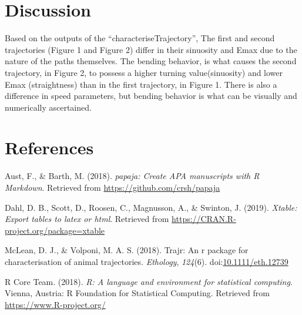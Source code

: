 \documentclass[man]{apa6}
\begin{document}
\section{Discussion}\label{discussion}

Based on the outputs of the \enquote{characteriseTrajectory}, The first
and second trajectories (Figure 1 and Figure 2) differ in their
sinuosity and Emax due to the nature of the paths themselves. The
bending behavior, is what causes the second trajectory, in Figure 2, to
possess a higher turning value(sinuosity) and lower Emax (straightness)
than in the first trajectory, in Figure 1. There is also a difference in
speed parameters, but bending behavior is what can be visually and
numerically ascertained.

\newpage

\section{References}\label{references}

\begingroup
\setlength{\parindent}{-0.5in} \setlength{\leftskip}{0.5in}

\hypertarget{refs}{}
\hypertarget{ref-R-papaja}{}
Aust, F., \& Barth, M. (2018). \emph{papaja: Create APA manuscripts with
R Markdown}. Retrieved from \url{https://github.com/crsh/papaja}

\hypertarget{ref-R-xtable}{}
Dahl, D. B., Scott, D., Roosen, C., Magnusson, A., \& Swinton, J.
(2019). \emph{Xtable: Export tables to latex or html}. Retrieved from
\url{https://CRAN.R-project.org/package=xtable}

\hypertarget{ref-Mclean2018}{}
McLean, D. J., \& Volponi, M. A. S. (2018). Trajr: An r package for
characterisation of animal trajectories. \emph{Ethology}, \emph{124}(6).
doi:\href{https://doi.org/10.1111/eth.12739}{10.1111/eth.12739}

\hypertarget{ref-R-base}{}
R Core Team. (2018). \emph{R: A language and environment for statistical
computing}. Vienna, Austria: R Foundation for Statistical Computing.
Retrieved from \url{https://www.R-project.org/}

\endgroup
\end{document}

